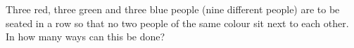 Three red, three green and three blue people (nine different people) are to be seated in a row so that no two people of the same colour sit next to each other. In how many ways can this be done?
